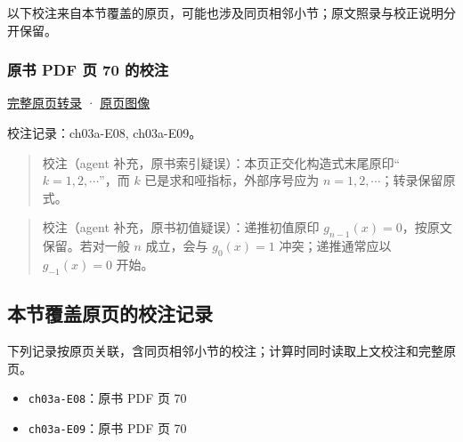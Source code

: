\documentclass[
  10pt,
  fontset=fandol]{ctexart}
\providecommand{\tightlist}{%
  \setlength{\itemsep}{0pt}\setlength{\parskip}{0pt}}
\begin{document}
以下校注来自本节覆盖的原页，可能也涉及同页相邻小节；原文照录与校正说明分开保留。

\subsubsection{原书 PDF 页 70 的校注}\label{ux539fux4e66-pdf-ux9875-70-ux7684ux6821ux6ce8}

\href{../pages/pdf-070.md}{完整原页转录} · \href{../../source-images/pdf-070.jpeg}{原页图像}

校注记录：ch03a-E08, ch03a-E09。

\begin{quote}
校注（agent 补充，原书索引疑误）：本页正交化构造式末尾原印``\(k=1,2,\cdots\)''，而 \(k\) 已是求和哑指标，外部序号应为 \(n=1,2,\cdots\)；转录保留原式。
\end{quote}

\begin{quote}
校注（agent 补充，原书初值疑误）：递推初值原印 \(g_{n-1}(x)=0\)，按原文保留。若对一般 \(n\) 成立，会与 \(g_0(x)=1\) 冲突；递推通常应以 \(g_{-1}(x)=0\) 开始。
\end{quote}

\subsection{本节覆盖原页的校注记录}\label{ux672cux8282ux8986ux76d6ux539fux9875ux7684ux6821ux6ce8ux8bb0ux5f55}

下列记录按原页关联，含同页相邻小节的校注；计算时同时读取上文校注和完整原页。

\begin{itemize}
\tightlist
\item
  \texttt{ch03a-E08}：原书 PDF 页 70
\item
  \texttt{ch03a-E09}：原书 PDF 页 70
\end{itemize}
\end{document}
